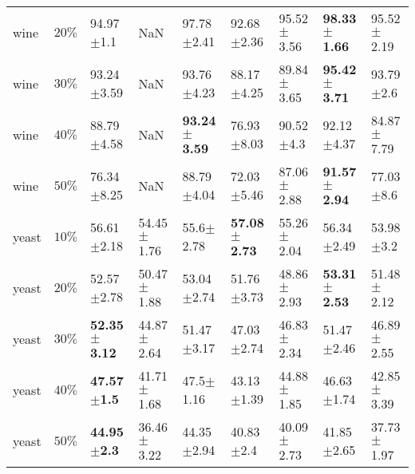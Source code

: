 \begin{tabular}{lllllllll}
         wine &     $ 20\% $ &           94.97$\pm$1.1 &             NaN &          97.78$\pm$2.41 &          92.68$\pm$2.36 &          95.52$\pm$3.56 & \textbf{98.33$\pm$1.66} &          95.52$\pm$2.19 \\
         wine &     $ 30\% $ &          93.24$\pm$3.59 &             NaN &          93.76$\pm$4.23 &          88.17$\pm$4.25 &          89.84$\pm$3.65 & \textbf{95.42$\pm$3.71} &           93.79$\pm$2.6 \\
         wine &     $ 40\% $ &          88.79$\pm$4.58 &             NaN & \textbf{93.24$\pm$3.59} &          76.93$\pm$8.03 &           90.52$\pm$4.3 &          92.12$\pm$4.37 &          84.87$\pm$7.79 \\
         wine &     $ 50\% $ &          76.34$\pm$8.25 &             NaN &          88.79$\pm$4.04 &          72.03$\pm$5.46 &          87.06$\pm$2.88 & \textbf{91.57$\pm$2.94} &           77.03$\pm$8.6 \\
        yeast &     $ 10\% $ &          56.61$\pm$2.18 &  54.45$\pm$1.76 &           55.6$\pm$2.78 & \textbf{57.08$\pm$2.73} &          55.26$\pm$2.04 &          56.34$\pm$2.49 &           53.98$\pm$3.2 \\
        yeast &     $ 20\% $ &          52.57$\pm$2.78 &  50.47$\pm$1.88 &          53.04$\pm$2.74 &          51.76$\pm$3.73 &          48.86$\pm$2.93 & \textbf{53.31$\pm$2.53} &          51.48$\pm$2.12 \\
        yeast &     $ 30\% $ & \textbf{52.35$\pm$3.12} &  44.87$\pm$2.64 &          51.47$\pm$3.17 &          47.03$\pm$2.74 &          46.83$\pm$2.34 &          51.47$\pm$2.46 &          46.89$\pm$2.55 \\
        yeast &     $ 40\% $ &  \textbf{47.57$\pm$1.5} &  41.71$\pm$1.68 &           47.5$\pm$1.16 &          43.13$\pm$1.39 &          44.88$\pm$1.85 &          46.63$\pm$1.74 &          42.85$\pm$3.39 \\
        yeast &     $ 50\% $ &  \textbf{44.95$\pm$2.3} &  36.46$\pm$3.22 &          44.35$\pm$2.94 &           40.83$\pm$2.4 &          40.09$\pm$2.73 &          41.85$\pm$2.65 &          37.73$\pm$1.97 \\
\bottomrule
\end{tabular}
